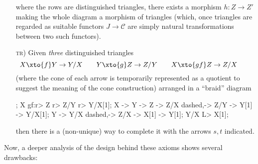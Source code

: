 \documentclass[11pt, a4paper]{amsart}
\renewcommand{\C}{\mathcal{C}}
\begin{document}
\begin{definition}
\begin{enumerate}[label=\smallcap{pt} \oldstylenums{\arabic*})]
\[\]
where the rows are distinguished triangles, there exists a morphism $h\colon Z\to Z'$ making the whole diagram a morphism of triangles (which, once triangles are regarded as suitable functors $J\to \C$ are simply natural transformations between two such functors).
\item[\textsc{tr})] \label{item:tr} Given \emph{three} distinguished triangles
\[
X\xto{f}Y\to Y/X\qquad
Y\xto{g}Z\to Z/Y\qquad
X\xto{gf}Z\to Z/X\qquad
\]
(where the cone of each arrow is temporarily represented as a quotient to suggest the meaning of the cone construction) arranged in a ``braid'' diagram
\begin{center}
\begin{kD}
;
\mor X gf:r> Z r> Z/Y r> Y/X[1];
\mor X -> Y -> Z -> Z/X dashed,-> Z/Y -> Y[1] -> Y/X[1];
\mor Y -> Y/X dashed,-> Z/X -> X[1] -> Y[1];
\mor Y/X L> X[1];
\end{kD}
\end{center}
then there is a (non-unique) way to complete it with the arrows $s,t$ indicated.
\end{enumerate}
\end{definition}
Now, a deeper analysis of the design behind these axioms shows several drawbacks:
\end{document}
